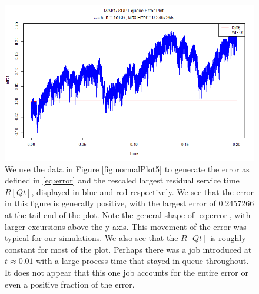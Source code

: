 \documentclass[12pt]{article}
\theoremstyle{plain}
\theoremstyle{definition}
\theoremstyle{remark}
\begin{document}
\begin{figure}[H]
\centering
\includegraphics[width = \textwidth]{Pictures/errorPlot5.png}
\caption{We use the data in Figure \ref{fig:normalPlot5} to generate the error as defined in \eqref{eq:error} and the rescaled largest residual service time $R[Qt]$, displayed in blue and red respectively. We see that the error in this figure is generally positive, with the largest error of 0.2457266 at the tail end of the plot. Note the general shape of \eqref{eq:error}, with larger excursions above the y-axis. This movement of the error was typical for our simulations. We also see that the $R[Qt]$ is roughly constant for most of the plot. Perhaps there was a job introduced at $t \approx 0.01$ with a large process time that stayed in queue throughout. It does not appear that this one job accounts for the entire error or even a positive fraction of the error.}
\label{fig:errorPlot5}
\end{figure}
\end{document}
